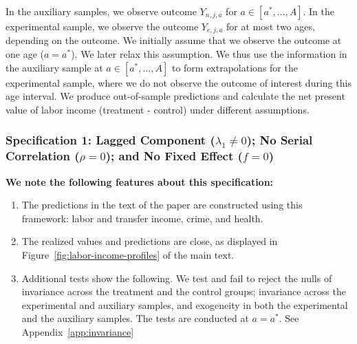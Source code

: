 \noindent In the auxiliary samples, we observe outcome $Y_{n,j,a}$ for $a \in [a^*, \ldots, A]$. In the experimental sample, we observe the outcome $Y_{e,j,a}$ for at most two ages, depending on the outcome. We initially assume that we observe the outcome at one age ($a = a^*$). We later relax this assumption. We thus use the information in the auxiliary sample at  $a \in [a^*, \ldots, A]$ to form extrapolations for the experimental sample, where we do not observe the outcome of interest during this age interval. We produce out-of-sample predictions and calculate the net present value of labor income (treatment - control) under different assumptions.\\

\subsubsection{Specification 1: Lagged Component ($\lambda_{1} \neq 0$); No Serial Correlation ($\rho = 0$); and No Fixed Effect ($f = 0$)} \label{app:spec1}

\noindent \textbf{We note the following features about this specification:}

\begin{enumerate}

\item The predictions in the text of the paper are constructed using this framework: labor and transfer income, crime, and health.
\item The realized values and predictions are close, as displayed in Figure~\ref{fig:labor-income-profiles} of the main text.
\item Additional tests show the following. We test and fail to reject the nulls of invariance across the treatment and the control groups; invariance across the experimental and auxiliary samples, and exogeneity in both the experimental and the auxiliary samples.  The tests are conducted at $a = a^*$. See Appendix~\ref{app:invariance}
\end{enumerate}

